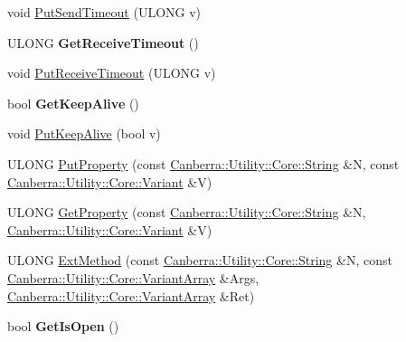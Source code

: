 \begin{DoxyCompactItemize}
\item 
void \hyperlink{class_canberra_1_1_protocols_1_1_lynx_1_1_device_a92c3e56b497ed2f58afb198746b6f4c5_a92c3e56b497ed2f58afb198746b6f4c5}{Put\+Send\+Timeout} (U\+L\+O\+NG v)
\item 
\mbox{\label{class_canberra_1_1_protocols_1_1_lynx_1_1_device_a9e6e79fe9d532a4bf9ff92befa2de863}} 
U\+L\+O\+NG {\bfseries Get\+Receive\+Timeout} ()
\item 
void \hyperlink{class_canberra_1_1_protocols_1_1_lynx_1_1_device_a881814ede0fd879e649e027f41b03b94_a881814ede0fd879e649e027f41b03b94}{Put\+Receive\+Timeout} (U\+L\+O\+NG v)
\item 
\mbox{\label{class_canberra_1_1_protocols_1_1_lynx_1_1_device_ac917db8daa65be2a85d24c8f30801f4f}} 
bool {\bfseries Get\+Keep\+Alive} ()
\item 
void \hyperlink{class_canberra_1_1_protocols_1_1_lynx_1_1_device_a8ebcebb05d610ae6d907955bc4f78c29_a8ebcebb05d610ae6d907955bc4f78c29}{Put\+Keep\+Alive} (bool v)
\item 
U\+L\+O\+NG \hyperlink{class_canberra_1_1_protocols_1_1_lynx_1_1_device_aa3f539662d82072bbd58bb0b01b98b96_aa3f539662d82072bbd58bb0b01b98b96}{Put\+Property} (const \hyperlink{class_canberra_1_1_utility_1_1_core_1_1_string}{Canberra\+::\+Utility\+::\+Core\+::\+String} \&N, const \hyperlink{class_canberra_1_1_utility_1_1_core_1_1_variant}{Canberra\+::\+Utility\+::\+Core\+::\+Variant} \&V)
\item 
U\+L\+O\+NG \hyperlink{class_canberra_1_1_protocols_1_1_lynx_1_1_device_aaccfa27ad7d6286377093d4ab5b004b4_aaccfa27ad7d6286377093d4ab5b004b4}{Get\+Property} (const \hyperlink{class_canberra_1_1_utility_1_1_core_1_1_string}{Canberra\+::\+Utility\+::\+Core\+::\+String} \&N, \hyperlink{class_canberra_1_1_utility_1_1_core_1_1_variant}{Canberra\+::\+Utility\+::\+Core\+::\+Variant} \&V)
\item 
U\+L\+O\+NG \hyperlink{class_canberra_1_1_protocols_1_1_lynx_1_1_device_a0d3ade2b5f6cbc402008bad5427d3da6_a0d3ade2b5f6cbc402008bad5427d3da6}{Ext\+Method} (const \hyperlink{class_canberra_1_1_utility_1_1_core_1_1_string}{Canberra\+::\+Utility\+::\+Core\+::\+String} \&N, const \hyperlink{class_canberra_1_1_utility_1_1_core_1_1_variant_array}{Canberra\+::\+Utility\+::\+Core\+::\+Variant\+Array} \&Args, \hyperlink{class_canberra_1_1_utility_1_1_core_1_1_variant_array}{Canberra\+::\+Utility\+::\+Core\+::\+Variant\+Array} \&Ret)
\item 
\mbox{\label{class_canberra_1_1_protocols_1_1_lynx_1_1_device_a398c465b88cfc162888d77d6279a8825}} 
bool {\bfseries Get\+Is\+Open} ()
\end{DoxyCompactItemize}
